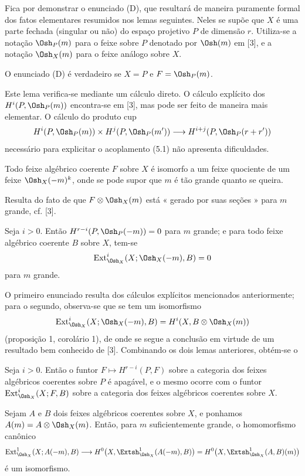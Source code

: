 Fica por demonstrar o enunciado (D), que resultará de maneira puramente formal dos fatos
elementares resumidos nos lemas seguintes. Neles se supõe que $X$ é uma
parte fechada (singular ou não) do espaço projetivo $P$ de dimensão $r$.
Utiliza-se a notação $\Osh_P(m)$ para o feixe sobre $P$ denotado por $\Osh(m)$ em
[3], e a notação $\Osh_X(m)$ para o feixe análogo sobre $X$.

 O enunciado (D) é verdadeiro se $X=P$ e $F=\Osh_P(m)$.

Este lema verifica-se mediante um cálculo direto. O cálculo explícito dos
$H^{i}(P,\Osh_P(m))$ encontra-se em [3], mas pode ser feito de maneira mais
elementar. O cálculo do produto cup
\[
  H^{i}(P,\Osh_P(m))\times H^{j}(P,\Osh_P(m'))
  \longrightarrow H^{i+j}(P,\Osh_P(r+r'))
\]
necessário para explicitar o acoplamento (5.1) não apresenta
dificuldades.

 Todo feixe algébrico coerente $F$ sobre $X$ é isomorfo a
um feixe quociente de um feixe $\Osh_X(-m)^{k}$, onde se pode supor que $m$ é
tão grande quanto se queira.

Resulta do fato de que $F\otimes\Osh_X(m)$ está « gerado por suas seções » para
$m$ grande, cf. [3].

 Seja $i>0$. Então
$H^{r-i}(P,\Osh_P(-m))=0$ para $m$ grande; e para todo feixe algébrico
coerente $B$ sobre $X$, tem-se
\[
  \operatorname{Ext}_{\Osh_X}^{i}(X;\Osh_X(-m),B)=0
\]
para $m$ grande.

O primeiro enunciado resulta dos cálculos explícitos mencionados anteriormente; para o
segundo, observa-se que se tem um isomorfismo
\[
  \operatorname{Ext}_{\Osh_X}^{i}(X;\Osh_X(-m),B)
  =H^{i}(X,B\otimes\Osh_X(m))
\]
(proposição 1, corolário 1), de onde se segue a conclusão em virtude de um resultado bem
conhecido de [3]. Combinando os dois lemas anteriores, obtém-se o

 Seja $i>0$. Então o funtor
$F\longmapsto H^{r-i}(P,F)$ sobre a categoria dos feixes algébricos coerentes
sobre $P$ é apagável, e o mesmo ocorre com o funtor
$\operatorname{Ext}_{\Osh_X}^{i}(X;F,B)$ sobre a categoria dos feixes
algébricos coerentes sobre $X$.

 Sejam $A$ e $B$ dois feixes algébricos coerentes sobre
$X$, e ponhamos $A(m)=A\otimes\Osh_X(m)$. Então, para $m$ suficientemente grande,
o homomorfismo canônico
\[
  \operatorname{Ext}_{\Osh_X}^{1}(X;A(-m),B)
  \longrightarrow H^{0}\bigl(X,\Extsh_{\Osh_X}^{1}(A(-m),B)\bigr)
  =H^{0}\bigl(X,\Extsh_{\Osh_X}^{1}(A,B)(m)\bigr)
\]
é um isomorfismo.

